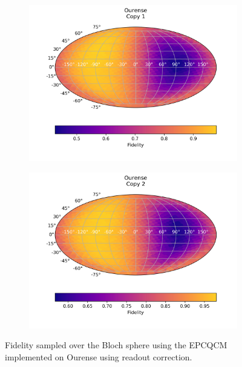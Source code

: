   \begin{figure}[H]
    \centering
    \begin{subfigure}{.5\textwidth}
      \centering
      \includegraphics[width=\textwidth]{Figures/Economical/IBM/FullSphere/results_ourense_copy1.png}
      
      \label{fig:epc_uncorrected_ourense_sphere_1}
    \end{subfigure}%
    \begin{subfigure}{.5\textwidth}
      \centering
      \includegraphics[width=\textwidth]{Figures/Economical/IBM/FullSphere/results_ourense_copy2.png}
      
      \label{fig:epc_uncorrected_ourense_sphere_2}
    \end{subfigure}
    \caption{Fidelity sampled over the Bloch sphere using the EPCQCM implemented on Ourense using readout correction.}
    \label{fig:epc_uncorrected_ourense_sphere}
  \end{figure}
  
